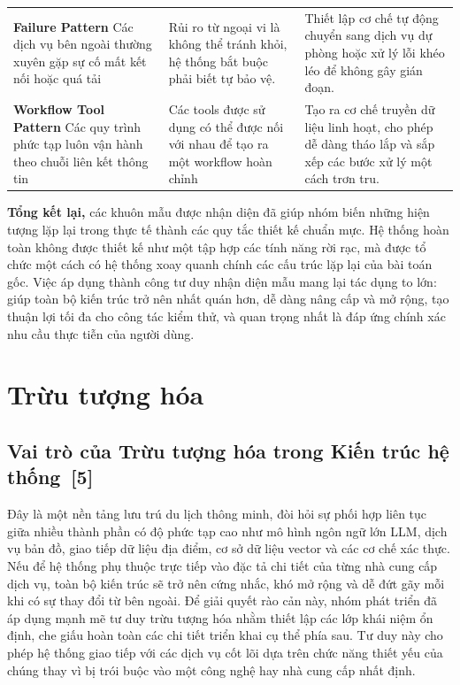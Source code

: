 \documentclass[12pt, a4paper]{article}
\begin{document}
{\begin{xltabular}{\textwidth}{@{} >{\raggedright\arraybackslash{}\hsize}X >{\raggedright\arraybackslash{}\hsize}X >{\raggedright\arraybackslash{}\hsize}X @{}}
    \addlinespace
    \textbf{Failure Pattern} \newline Các dịch vụ bên ngoài thường xuyên gặp sự cố mất kết nối hoặc quá tải & Rủi ro từ ngoại vi là không thể tránh khỏi, hệ thống bắt buộc phải biết tự bảo vệ. & Thiết lập cơ chế tự động chuyển sang dịch vụ dự phòng hoặc xử lý lỗi khéo léo để không gây gián đoạn. \\
    \addlinespace
    \textbf{Workflow Tool Pattern} \newline Các quy trình phức tạp luôn vận hành theo chuỗi liên kết thông tin & Các tools được sử dụng có thể được nối với nhau để tạo ra một workflow hoàn chỉnh & Tạo ra cơ chế truyền dữ liệu linh hoạt, cho phép dễ dàng tháo lắp và sắp xếp các bước xử lý một cách trơn tru. \\
\end{xltabular}}

\vspace{0.3cm}
\noindent \textbf{Tổng kết lại,} các khuôn mẫu được nhận diện đã giúp nhóm biến những hiện tượng lặp lại trong thực tế thành các quy tắc thiết kế chuẩn mực. Hệ thống hoàn toàn không được thiết kế như một tập hợp các tính năng rời rạc, mà được tổ chức một cách có hệ thống xoay quanh chính các cấu trúc lặp lại của bài toán gốc. Việc áp dụng thành công tư duy nhận diện mẫu mang lại tác dụng to lớn: giúp toàn bộ kiến trúc trở nên nhất quán hơn, dễ dàng nâng cấp và mở rộng, tạo thuận lợi tối đa cho công tác kiểm thử, và quan trọng nhất là đáp ứng chính xác nhu cầu thực tiễn của người dùng.

\newpage
\section{Trừu tượng hóa}

\subsection[Vai trò của Trừu tượng hóa trong Kiến trúc hệ thống]{Vai trò của Trừu tượng hóa trong Kiến trúc hệ thống \,{\normalfont\small\textcolor{cyan!70!black}{[5]}}}

Đây là một nền tảng lưu trú du lịch thông minh, đòi hỏi sự phối hợp liên tục giữa nhiều thành phần có độ phức tạp cao như mô hình ngôn ngữ lớn LLM, dịch vụ bản đồ, giao tiếp dữ liệu địa điểm, cơ sở dữ liệu vector và các cơ chế xác thực. Nếu để hệ thống phụ thuộc trực tiếp vào đặc tả chi tiết của từng nhà cung cấp dịch vụ, toàn bộ kiến trúc sẽ trở nên cứng nhắc, khó mở rộng và dễ đứt gãy mỗi khi có sự thay đổi từ bên ngoài. Để giải quyết rào cản này, nhóm phát triển đã áp dụng mạnh mẽ tư duy trừu tượng hóa nhằm thiết lập các lớp khái niệm ổn định, che giấu hoàn toàn các chi tiết triển khai cụ thể phía sau. Tư duy này cho phép hệ thống giao tiếp với các dịch vụ cốt lõi dựa trên chức năng thiết yếu của chúng thay vì bị trói buộc vào một công nghệ hay nhà cung cấp nhất định.
\end{document}
